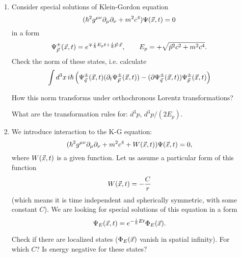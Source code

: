 \documentclass[a4paper,11pt]{article}
\begin{document}
\begin{enumerate}
\item Consider special solutions of Klein-Gordon equation
  \begin{equation}
    \label{eq:4}
    ( \hbar^{ 2 } g^{ \mu \nu } \partial_{ \mu } \partial_{ \nu } + m^{ 2 } c^{ 4 } ) \Psi( \vec{x}, t )
    = 0
  \end{equation}
  in a form
  \begin{equation}
    \label{eq:5}
    \Psi^{ \pm }_{ \vec{p} }( \vec{x}, t ) =
    e^{ \mp \frac{ i }{ \hbar } E_{ p } t + \frac{ i }{ \hbar } \vec{p} \cdot \vec{x} }, \qquad
    E_{ p } = +\sqrt{ \vec{p}^{ 2 } c^{ 2 } + m^{ 2 } c^{ 4 } }.
  \end{equation}
  Check the norm of these states, i.e. calculate
  \begin{equation}
    \label{eq:11}
    \int d^{ 3 } x \, i \hbar
    \left( \Psi^{ \pm }_{ \vec{q} }( \vec{x}, t )
      ( \partial_{ t } \Psi^{ \pm }_{ \vec{p} }( \vec{x}, t ) )
      - ( \partial \Psi^{ \pm }_{ \vec{q} }( \vec{x}, t ) ) \Psi^{ \pm }_{ \vec{p} }( \vec{x}, t )
    \right)
  \end{equation}

  How this norm transforms under orthochronous Lorentz
  transformations?

  What are the transformation rules for: $d^{ 3 } p$,
  $d^{ 3 } p / ( 2 E_{ p } )$.



\item We introduce interaction to the K-G equation:
  \begin{equation}
    \label{eq:12}
    ( \hbar^{ 2 } g^{ \mu \nu } \partial_{ \mu } \partial_{ \nu } + m^{ 2 } c^{ 4 } + W( \vec{x}, t ) )
    \Psi( \vec{x}, t )
    = 0,
  \end{equation}
  where $W( \vec{x}, t )$ is a given function. Let us assume a
  particular form of this function
  \begin{equation}
    \label{eq:13}
    W( \vec{x}, t ) = -\frac{ C }{ r }
  \end{equation}
  (which means it is time independent and spherically symmetric, with
  some constant $C$). We are looking for special solutions of this
  equation in a form
  \begin{equation}
    \label{eq:14}
    \Psi_{ E }( \vec{x}, t ) = e^{ -\frac{ i }{ \hbar } E t } \Phi_{ E }( \vec{x} ).
  \end{equation}

  Check if there are localized states ($\Phi_{ E }( \vec{x} )$ vanish in
  spatial infinity). For which $C$? Is energy negative for these
  states?


\end{enumerate}
\end{document}
